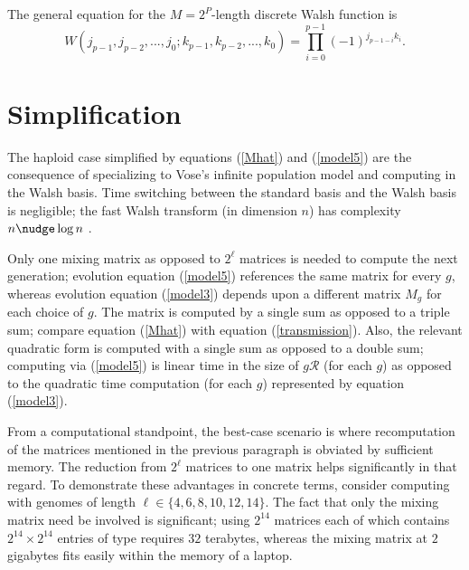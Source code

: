 The general equation for the $M= 2^P$-length discrete Walsh function is 
\[
W(j_{p-1},j_{p-2},...,j_0;k_{p-1},k_{p-2},...,k_0) = \prod_{i=0}^{p-1} (-1)^{j_{p-1-i}k_i}.
\]


\section{Simplification} 
The haploid case simplified by equations (\ref{Mhat}) and (\ref{model5})
are the consequence of specializing to Vose's infinite population model and computing in the Walsh basis. Time switching between the standard basis and the Walsh basis is negligible; the fast Walsh transform (in dimension $n$) has complexity $n \nudge \log n$ \cite{Shanks1969}.

Only one mixing matrix as opposed to $2^\ell$ matrices is needed to compute the next generation; evolution equation (\ref{model5}) references the same matrix for every $g$, whereas evolution equation (\ref{model3}) depends upon a different matrix $M_g$ for each choice of $g$. The matrix is computed by a single sum as opposed to a triple sum; compare equation (\ref{Mhat}) with equation (\ref{transmission}).  Also, the relevant quadratic form is computed with a single sum as opposed to a double sum; computing via (\ref{model5}) is linear time in the size of $g \mathcal{R}$ (for each $g$) as opposed to the quadratic time computation (for each $g$) represented by equation (\ref{model3}).

From a computational standpoint, the best-case scenario is where
recomputation of the matrices mentioned in the previous paragraph is
obviated by sufficient memory.  The reduction from $2^\ell$ matrices
to one matrix helps significantly in that regard. To demonstrate these advantages in concrete terms, consider computing
with genomes of length $\ell \in \{4,6,8,10,12,14\}$.  The fact that
only the mixing matrix need be involved is significant; using $2^{14}$
matrices each of which contains $2^{14} \times 2^{14}$ entries of type
\verb@double@ requires $32$ terabytes, whereas the mixing matrix at
$2$ gigabytes fits easily within the memory of a laptop.


